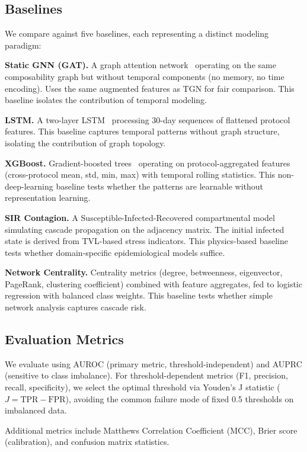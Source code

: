 \documentclass[journal]{IEEEtran}
\begin{document}
\subsection{Baselines}

We compare against five baselines, each representing a distinct modeling paradigm:

\textbf{Static GNN (GAT).} A graph attention network~\cite{velickovic2018gat} operating on the same composability graph but without temporal components (no memory, no time encoding). Uses the same augmented features as TGN for fair comparison. This baseline isolates the contribution of temporal modeling.

\textbf{LSTM.} A two-layer LSTM~\cite{hochreiter1997lstm} processing 30-day sequences of flattened protocol features. This baseline captures temporal patterns without graph structure, isolating the contribution of graph topology.

\textbf{XGBoost.} Gradient-boosted trees~\cite{chen2016xgboost} operating on protocol-aggregated features (cross-protocol mean, std, min, max) with temporal rolling statistics. This non-deep-learning baseline tests whether the patterns are learnable without representation learning.

\textbf{SIR Contagion.} A Susceptible-Infected-Recovered compartmental model~\cite{hurd2016contagion} simulating cascade propagation on the adjacency matrix. The initial infected state is derived from TVL-based stress indicators. This physics-based baseline tests whether domain-specific epidemiological models suffice.

\textbf{Network Centrality.} Centrality metrics (degree, betweenness, eigenvector, PageRank, clustering coefficient) combined with feature aggregates, fed to logistic regression with balanced class weights. This baseline tests whether simple network analysis captures cascade risk.

\subsection{Evaluation Metrics}

We evaluate using AUROC (primary metric, threshold-independent) and AUPRC (sensitive to class imbalance). For threshold-dependent metrics (F1, precision, recall, specificity), we select the optimal threshold via Youden's J statistic ($J = \text{TPR} - \text{FPR}$), avoiding the common failure mode of fixed 0.5 thresholds on imbalanced data.

Additional metrics include Matthews Correlation Coefficient (MCC), Brier score (calibration), and confusion matrix statistics.
\end{document}
